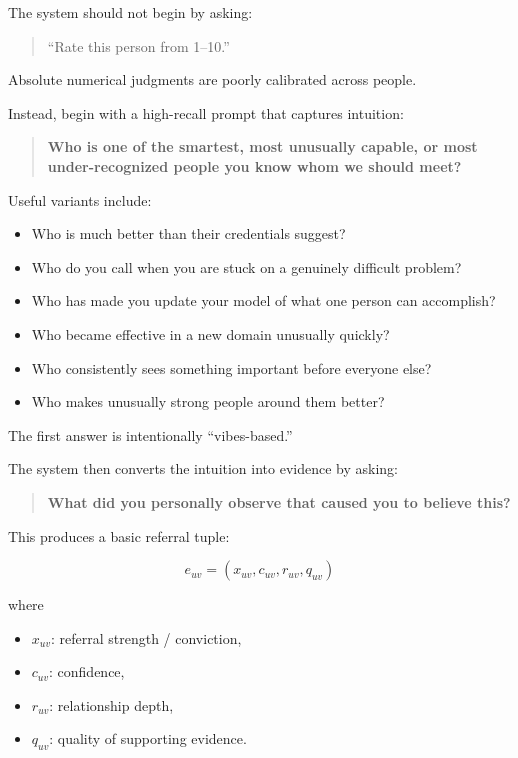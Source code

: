\documentclass[11pt]{article}
\begin{document}
The system should not begin by asking:

\begin{quote}
``Rate this person from 1--10.''
\end{quote}

Absolute numerical judgments are poorly calibrated across people.

Instead, begin with a high-recall prompt that captures intuition:

\begin{quote}
\textbf{Who is one of the smartest, most unusually capable, or most
under-recognized people you know whom we should meet?}
\end{quote}

Useful variants include:

\begin{itemize}
    \item Who is much better than their credentials suggest?
    \item Who do you call when you are stuck on a genuinely difficult problem?
    \item Who has made you update your model of what one person can accomplish?
    \item Who became effective in a new domain unusually quickly?
    \item Who consistently sees something important before everyone else?
    \item Who makes unusually strong people around them better?
\end{itemize}

The first answer is intentionally ``vibes-based.''

The system then converts the intuition into evidence by asking:

\begin{quote}
\textbf{What did you personally observe that caused you to believe this?}
\end{quote}

This produces a basic referral tuple:

\[
e_{uv}
=
(x_{uv}, c_{uv}, r_{uv}, q_{uv})
\]

where

\begin{itemize}
    \item \(x_{uv}\): referral strength / conviction,
    \item \(c_{uv}\): confidence,
    \item \(r_{uv}\): relationship depth,
    \item \(q_{uv}\): quality of supporting evidence.
\end{itemize}
\end{document}
